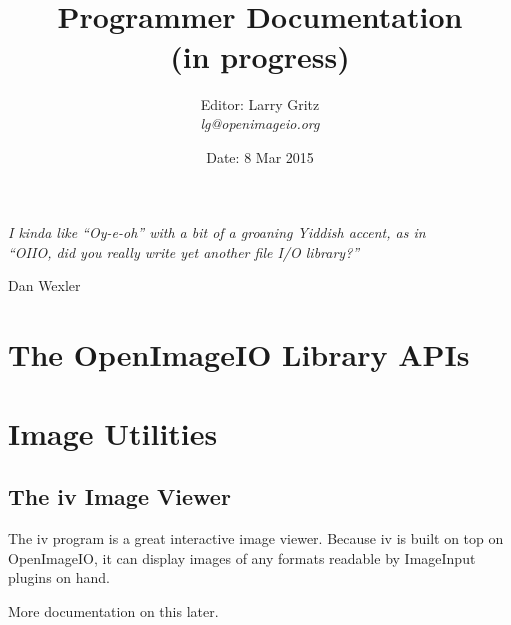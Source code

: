 \documentclass[11pt,letterpaper]{book}
\title{ 
{\Huge{\bf \product}
{\bf\sffamily \versionnumber} \medskip \\ \huge Programmer Documentation
\\ \large (in progress)
} \bigskip }
\author{Editor: Larry Gritz \\
\emph{lg@openimageio.org}
 \bigskip \\
}
\date{{\large 
Date: 8 Mar 2015
}}
\def\product{{\sffamily OpenImageIO}\xspace}
\def\ImageInput{{\codefont ImageInput}\xspace}
\begin{document}
\frontmatter

\maketitle



\vspace*{2in}

\begin{centering}
\emph{I kinda like ``Oy-e-oh'' with a bit of a groaning Yiddish accent, as in\\
``OIIO, did you really write yet another file I/O library?''} \\
\end{centering}
\medskip
\begin{centering}
\center Dan Wexler \\
\end{centering}




\setcounter{tocdepth}{1}
\tableofcontents

\mainmatter



\part{The OpenImageIO Library APIs}













\part{Image Utilities}



\chapter{The {\kw iv} Image Viewer}
\label{chap:iv}

The {\cf iv} program is a great interactive image viewer.  Because {\cf
  iv} is built on top on \product, it can display images of any formats
readable by \ImageInput plugins on hand.

\medskip

More documentation on this later.
\end{document}
